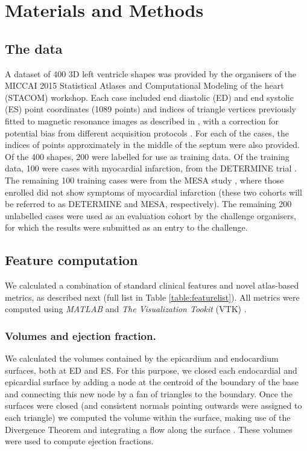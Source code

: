 \documentclass{llncs}
\begin{document}
\section{Materials and Methods}
	\subsection{The data}
A dataset of 400 3D left ventricle shapes was provided by the organisers of the MICCAI 2015 Statistical Atlases and Computational Modeling of the heart (STACOM) workshop. Each case included end diastolic (ED) and end systolic (ES) point coordinates (1089 points) and indices of triangle vertices previously fitted to magnetic resonance images as described in \cite{Young2000}, with a correction for potential bias from different acquisition protocols \cite{Medrano-Gracia2013}. For each of the cases, the indices of points approximately in the middle of the septum were also provided. Of the 400 shapes, 200 were labelled for use as training data. Of the training data, 100 were cases with myocardial infarction, from the DETERMINE trial \cite{Kadish2009}. The remaining 100 training cases were from the MESA study \cite{Bild2002}, where those enrolled did not show symptoms of myocardial infarction (these two cohorts will be referred to as DETERMINE and MESA, respectively). The remaining 200 unlabelled cases were used as an evaluation cohort by the challenge organisers, for which the results were submitted as an entry to the challenge. 


	\subsection{Feature computation}
	We calculated a combination of standard clinical features and novel atlas-based metrics, as described next (full list in Table \ref{table:featurelist}). All metrics were computed using \emph{\mbox{MATLAB}} and \emph{The Visualization Tookit} (VTK) \cite{Schroeder2006}.
	\subsubsection{Volumes and ejection fraction.}
We calculated the volumes contained by the epicardium and endocardium surfaces, both at ED and ES. For this purpose, we closed each endocardial and epicardial surface by adding a node at the centroid of the boundary of the base and connecting this new node by a fan of triangles to the boundary. Once the surfaces were closed (and consistent normals pointing outwards were assigned to each triangle) we computed the volume within the surface, making use of the Divergence Theorem and integrating a flow along the surface \cite{Millan2007}. These volumes were used to compute ejection fractions. 
\end{document}
